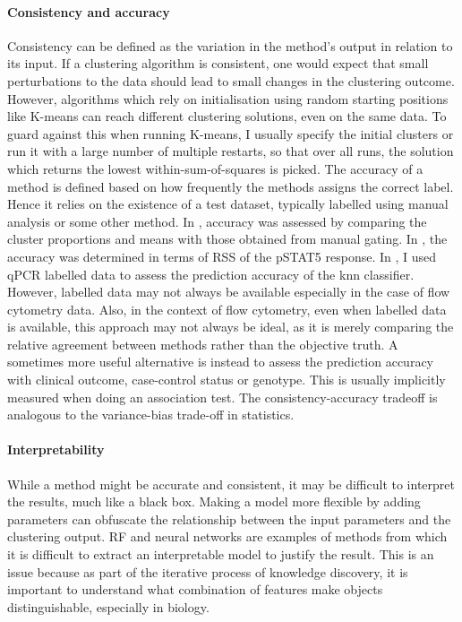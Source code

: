 \paragraph{Consistency and accuracy}
Consistency can be defined as the variation in the method's output in relation to its input.
If a clustering algorithm is consistent, one would expect that small perturbations to the data should lead to small changes in the clustering outcome.
However, algorithms which rely on initialisation using random starting positions like K-means can reach different clustering solutions, even on the same data.
To guard against this when running K-means, I usually specify the initial clusters or run it with a large number of multiple restarts, so that over all runs, the solution which returns the lowest within-sum-of-squares is picked.
The accuracy of a method is defined based on how frequently the methods assigns the correct label.
Hence it relies on the existence of a test dataset, typically labelled using manual analysis or some other method.
In , accuracy was assessed by comparing the cluster proportions and means with those obtained from manual gating.
In , the accuracy was determined in terms of RSS of the pSTAT5 response.
In , I used qPCR labelled data to assess the prediction accuracy of the \gls{knn} classifier.
However, labelled data may not always be available especially in the case of flow cytometry data.
Also, in the context of flow cytometry, even when labelled data is available, this approach may not always be ideal,
as it is merely comparing the relative agreement between methods rather than the objective truth.
A sometimes more useful alternative is instead to assess the prediction accuracy with clinical outcome, case-control status or genotype.
This is usually implicitly measured when doing an association test.
The consistency-accuracy tradeoff is analogous to the variance-bias trade-off in statistics.

\paragraph{Interpretability}
While a method might be accurate and consistent, it may be difficult to interpret the results, much like a black box.
Making a model more flexible by adding parameters can obfuscate the relationship between the input parameters and the clustering output.
\Acrfull{RF} and neural networks are examples of methods from which it is difficult to extract an interpretable model to justify the result.
This is an issue because
as part of the iterative process of knowledge discovery, it is important to understand what combination of features make objects distinguishable, especially in biology.


